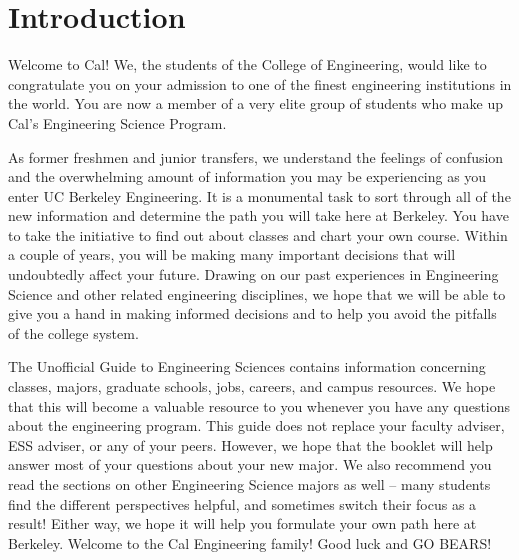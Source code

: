 \chapter*{Introduction}

Welcome to Cal! We, the students of the College of Engineering, would like to congratulate you on your admission to one of the finest engineering institutions in the world. You are now a member of a very elite group of students who make up Cal's Engineering Science Program.

As former freshmen and junior transfers, we understand the feelings of confusion and the overwhelming amount of information you may be experiencing as you enter UC Berkeley Engineering. It is a monumental task to sort through all of the new information and determine the path you will take here at Berkeley. You have to take the initiative to find out about classes and chart your own course. Within a couple of years, you will be making many important decisions that will undoubtedly affect your future. Drawing on our past experiences in Engineering Science and other related engineering disciplines, we hope that we will be able to give you a hand in making informed decisions and to help you avoid the pitfalls of the college system.

The Unofficial Guide to Engineering Sciences contains information concerning classes, majors, graduate schools, jobs, careers, and campus resources. We hope that this will become a valuable resource to you whenever you have any questions about the engineering program. This guide does not replace your faculty adviser, ESS adviser, or any of your peers. However, we hope that the booklet will help answer most of your questions about your new major. We also recommend you read the sections on other Engineering Science majors as well -- many students find the different perspectives helpful, and sometimes switch their focus as a result! Either way, we hope it will help you formulate your own path here at Berkeley. Welcome to the Cal Engineering family! Good luck and GO BEARS!

